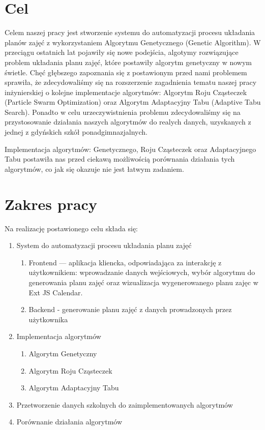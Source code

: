\section{Cel}
\par Celem naszej pracy jest stworzenie systemu do automatyzacji procesu układania planów zajęć z wykorzystaniem Algorytmu Genetycznego (Genetic Algorithm).  W przeciągu ostatnich lat pojawiły się nowe podejścia, algotymy rozwiązujące problem układania planu zajęć, które postawiły algorytm genetyczny w nowym świetle. Chęć głębszego zapoznania się z postawionym przed nami problemem sprawiła, że zdecydowaliśmy się na rozszerzenie zagadnienia tematu naszej pracy inżynierskiej o kolejne implementacje algorytmów: Algorytm Roju Cząsteczek (Particle Swarm Optimization) oraz Algorytm Adaptacyjny Tabu (Adaptive Tabu Search). Ponadto w celu urzeczywistnienia problemu zdecydowaliśmy się na przystosowanie działania naszych algorytmów do realych danych, uzyskanych z jednej z gdyńskich szkół ponadgimnazjalnych.
\par Implementacja algorytmów: Genetycznego, Roju Cząsteczek oraz Adaptacyjnego Tabu postawiła nas przed ciekawą możliwością porównania działania tych algorytmów, co jak się okazuje nie jest łatwym zadaniem.
\section{Zakres pracy}
\par Na realizację postawionego celu składa się:
\begin{enumerate}
\item System do automatyzacji procesu układania planu zajęć
\begin{enumerate}
\item Frontend — aplikacja kliencka, odpowiadająca za interakcję z użytkownikiem: wprowadzanie danych wejściowych, wybór algorytmu do generowania planu zajęć oraz wizualizacja wygenerowanego planu zajęc w Ext JS Calendar.
\item Backend - generowanie planu zajęć z danych prowadzonych przez użytkownika 
\end{enumerate}
\item Implementacja algorytmów
\begin{enumerate}
\item Algorytm Genetyczny
\item Algorytm Roju Cząsteczek
\item Algorytm Adaptacyjny Tabu
\end{enumerate}
\item Przetworzenie danych szkolnych do zaimplementowanych algorytmów
\item Porównanie działania algorytmów

\end{enumerate}


